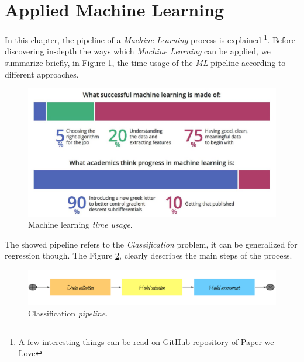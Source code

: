 

\section{Applied Machine Learning}

In this chapter, the pipeline of a {\emph{Machine Learning}} process is explained \footnote{A few interesting things can be read on GitHub repository of \href{https://github.com/papers-we-love/seattle/tree/master/useful-things-to-know-about-ml}{Paper-we-Love}}. Before discovering in-depth the ways which \emph{Machine Learning} can be applied, we summarize briefly, in Figure \ref{pic:time_usage}, the time usage of the \emph{ML} pipeline according to different approaches. 

\begin{figure}[H]%
 \centering
 \includegraphics[width=13cm]{./img/08/time_usage}
 \caption{\label{pic:time_usage} Machine learning \emph{time usage}.}
\end{figure}

The showed pipeline refers to the \emph{Classification} problem, it can be generalized for regression though. The Figure \ref{pic:classification_pipeline}, clearly describes the main steps of the process.

\begin{figure}[H]%
 \centering
 \includegraphics[width=13cm]{./img/08/classification_pipeline}
 \caption{\label{pic:classification_pipeline} Classification \emph{pipeline}.}
\end{figure}


